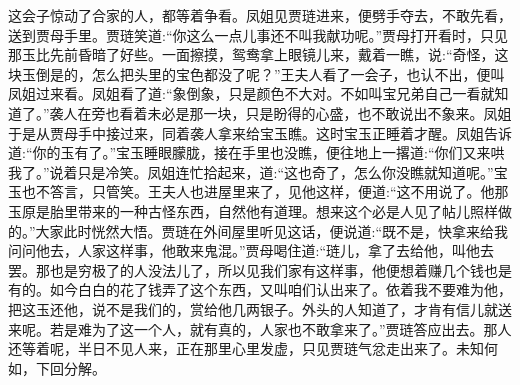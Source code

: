 \begin{parag}
    这会子惊动了合家的人，都等着争看。凤姐见贾琏进来，便劈手夺去，不敢先看，送到贾母手里。贾琏笑道:“你这么一点儿事还不叫我献功呢。”贾母打开看时，只见那玉比先前昏暗了好些。一面擦摸，鸳鸯拿上眼镜儿来，戴着一瞧，说:“奇怪，这块玉倒是的，怎么把头里的宝色都没了呢？”王夫人看了一会子，也认不出，便叫凤姐过来看。凤姐看了道:“象倒象，只是颜色不大对。不如叫宝兄弟自己一看就知道了。”袭人在旁也看着未必是那一块，只是盼得的心盛，也不敢说出不象来。凤姐于是从贾母手中接过来，同着袭人拿来给宝玉瞧。这时宝玉正睡着才醒。凤姐告诉道:“你的玉有了。”宝玉睡眼朦胧，接在手里也没瞧，便往地上一撂道:“你们又来哄我了。”说着只是冷笑。凤姐连忙拾起来，道:“这也奇了，怎么你没瞧就知道呢。”宝玉也不答言，只管笑。王夫人也进屋里来了，见他这样，便道:“这不用说了。他那玉原是胎里带来的一种古怪东西，自然他有道理。想来这个必是人见了帖儿照样做的。”大家此时恍然大悟。贾琏在外间屋里听见这话，便说道:“既不是，快拿来给我问问他去，人家这样事，他敢来鬼混。”贾母喝住道:“琏儿，拿了去给他，叫他去罢。那也是穷极了的人没法儿了，所以见我们家有这样事，他便想着赚几个钱也是有的。如今白白的花了钱弄了这个东西，又叫咱们认出来了。依着我不要难为他，把这玉还他，说不是我们的，赏给他几两银子。外头的人知道了，才肯有信儿就送来呢。若是难为了这一个人，就有真的，人家也不敢拿来了。”贾琏答应出去。那人还等着呢，半日不见人来，正在那里心里发虚，只见贾琏气忿走出来了。未知何如，下回分解。
\end{parag}